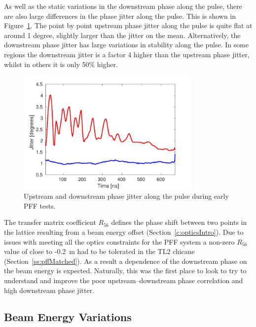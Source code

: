 As well as the static variations in the downstream phase along the pulse, there are also large differences in the phase jitter along the pulse. This is shown in Figure~\ref{f:origJitterAlong}. The point by point upstream phase jitter along the pulse is quite flat at around 1 degree, slightly larger than the jitter on the mean. Alternatively, the downstream phase jitter has large variations in stability along the pulse. In some regions the downstream jitter is a factor 4 higher than the upstream phase jitter, whilst in others it is only 50\% higher.

\begin{figure}
  \centering
  \includegraphics[width=0.8\textwidth]{Figures/propagation/origJitterAlong}
  \caption{Upstream and downstream phase jitter along the pulse during early PFF tests.}
  \label{f:origJitterAlong}
\end{figure}


The transfer matrix coefficient \(R_{56}\) defines the phase shift between two points in the lattice resulting from a beam energy offset (Section~\ref{c:opticsIntro}). Due to issues with meeting all the optics constraints for the PFF system a non-zero \(R_{56}\) value of close to -0.2~m had to be tolerated in the TL2 chicane (Section~\ref{ss:pffMatched}).  As a result a dependence of the downstream phase on the beam energy is expected. Naturally, this was the first place to look to try to understand and improve the poor upstream--downstream phase correlation and high downstream phase jitter.

\subsection{Beam Energy Variations}
\label{ss:energyVariations}


